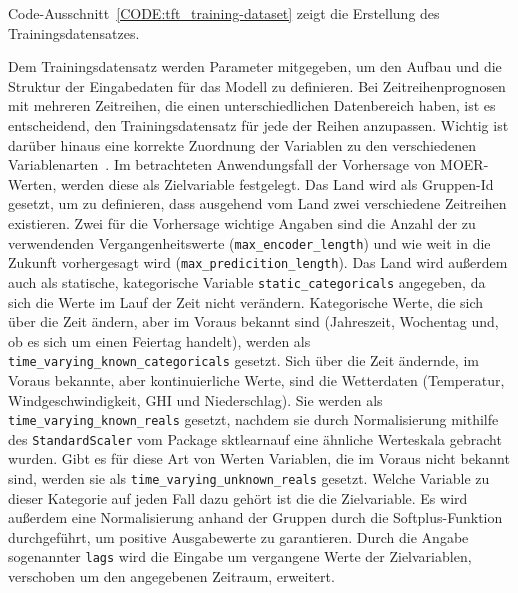 Code-Ausschnitt~\ref{CODE:tft_training-dataset} zeigt die Erstellung des Trainingsdatensatzes.

Dem Trainingsdatensatz werden Parameter mitgegeben, um den Aufbau und die Struktur der Eingabedaten für das Modell zu definieren.
Bei Zeitreihenprognosen mit mehreren Zeitreihen, die einen unterschiedlichen Datenbereich haben, ist es entscheidend, den Trainingsdatensatz für jede der Reihen anzupassen.
Wichtig ist darüber hinaus eine korrekte Zuordnung der Variablen zu den verschiedenen Variablenarten~\cite{GitHub.20240307T20:56:16.000Z}.
Im betrachteten Anwendungsfall der Vorhersage von \ac{MOER}-Werten, werden diese als Zielvariable festgelegt.
Das Land wird als Gruppen-Id gesetzt, um zu definieren, dass ausgehend vom Land zwei verschiedene Zeitreihen existieren.
Zwei für die Vorhersage wichtige Angaben sind die Anzahl der zu verwendenden Vergangenheitswerte (\lstinline[columns=fixed]{max_encoder_length}) und wie weit in die Zukunft vorhergesagt wird (\lstinline[columns=fixed]{max_predicition_length}).
Das Land wird außerdem auch als statische, kategorische Variable \lstinline[columns=fixed]{static_categoricals} angegeben, da sich die Werte im Lauf der Zeit nicht verändern.
Kategorische Werte, die sich über die Zeit ändern, aber im Voraus bekannt sind (Jahreszeit, Wochentag und, ob es sich um einen Feiertag handelt), werden als \lstinline[columns=fixed]{time_varying_known_categoricals} gesetzt.
Sich über die Zeit ändernde, im Voraus bekannte, aber kontinuierliche Werte, sind die Wetterdaten (Temperatur, Windgeschwindigkeit, \ac{GHI} und Niederschlag).
Sie werden als \lstinline[columns=fixed]{time_varying_known_reals} gesetzt, nachdem sie durch Normalisierung mithilfe des \lstinline[columns=fixed]{StandardScaler} vom Package \glqq sktlearn\grqq auf eine ähnliche Werteskala gebracht wurden.
Gibt es für diese Art von Werten Variablen, die im Voraus nicht bekannt sind, werden sie als \lstinline[columns=fixed]{time_varying_unknown_reals} gesetzt.
Welche Variable zu dieser Kategorie auf jeden Fall dazu gehört ist die die Zielvariable.
Es wird außerdem eine Normalisierung anhand der Gruppen durch die Softplus-Funktion durchgeführt, um positive Ausgabewerte zu garantieren.
Durch die Angabe sogenannter \lstinline[columns=fixed]{lags} wird die Eingabe um vergangene Werte der Zielvariablen, verschoben um den angegebenen Zeitraum, erweitert.
